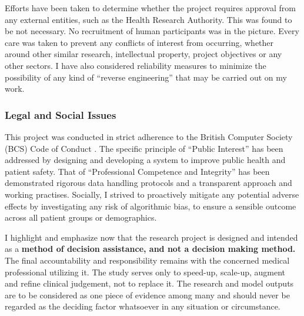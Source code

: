 \vspace{5pt}
\noindent Efforts have been taken to determine whether the project requires approval from any external entities, such as the Health Research Authority\cite{hraPlanning}. This was found to be not necessary. No recruitment of human participants was in the picture. Every care was taken to prevent any conflicts of interest from occurring, whether around other similar research, intellectual property, project objectives or any other sectors. I have also considered reliability measures to minimize the possibility of any kind of “reverse engineering” that may be carried out on my work. 

\subsubsection{Legal and Social Issues}
\noindent This project was conducted in strict adherence to the British Computer Society (BCS) Code of Conduct \cite{bcsCodeConduct}. The specific principle of “Public Interest” has been addressed by designing and developing a system to improve public health and patient safety. That of “Professional Competence and Integrity” has been demonstrated rigorous data handling protocols and a transparent approach and working practises. Socially, I strived to proactively mitigate any potential adverse effects by investigating any risk of algorithmic bias, to ensure a sensible outcome across all patient groups or demographics.

\vspace{5pt}	
\noindent I highlight and emphasize now that the research project is designed and intended as a \textbf{method of decision assistance, and not a decision making method.} The final accountability and responsibility remains with the concerned medical professional utilizing it. The study serves only to speed-up, scale-up, augment and refine clinical judgement, not to replace it. The research and model outputs are to be considered as one piece of evidence among many and should never be regarded as the deciding factor whatsoever in any situation or circumstance.

















